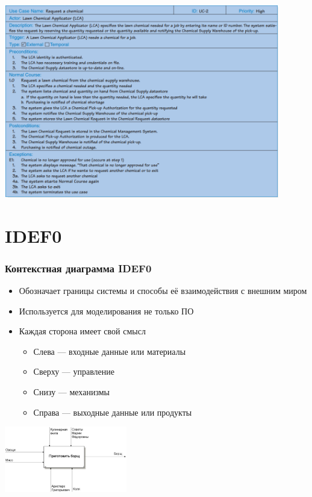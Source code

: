 \documentclass{../cscslides}
\begin{document}
    \begin{frame}
        \begin{center}
            \includegraphics[width=0.9\textwidth]{useCaseExample.png}
        \end{center}
    \end{frame}

    \section{IDEF0}

    \begin{frame}
        \frametitle{Контекстная диаграмма IDEF0}
        \begin{itemize}
            \item Обозначает границы системы и способы её взаимодействия с внешним миром
            \item Используется для моделирования не только ПО
            \item Каждая сторона имеет свой смысл
            \begin{itemize}
                \item Слева --- входные данные или материалы
                \item Сверху --- управление
                \item Снизу --- механизмы
                \item Справа --- выходные данные или продукты
            \end{itemize}
        \end{itemize}
        \begin{center}
            \includegraphics[width=0.4\textwidth]{idef0Example.png}
        \end{center}
    \end{frame}
\end{document}
